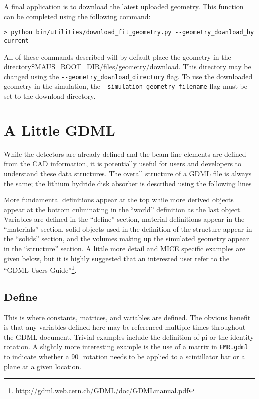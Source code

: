 A final application is to download the latest uploaded geometry. This
function can be completed using the following command:
\begin{verbatim}
> python bin/utilities/download_fit_geometry.py --geometry_download_by current
\end{verbatim}
All of these commands described will by default place the geometry in
the directory\linebreak\${MAUS\_ROOT\_DIR}/files/geometry/download. This
directory may be changed using the\linebreak
\verb+--geometry_download_directory+ flag. To use the downloaded
geometry in the simulation, the\linebreak\verb+--simulation_geometry_filename+
flag must be set to the download directory. 


\section{A Little GDML}
While the detectors are already defined and the beam line elements are
defined from the CAD information, it is potentially useful for users
and developers to understand these data structures. The overall
structure of a GDML file is always the same; the lithium hydride disk
absorber is described using the following lines


More fundamental definitions appear at the top while more derived
objects appear at the bottom culminating in the ``world'' definition
as the last object. Variables are defined in the ``define'' section,
material definitions appear in the ``materials'' section, solid
objects used in the definition of the structure appear in the
``solids'' section, and the volumes making up the simulated geometry
appear in the ``structure'' section.  A little more detail and MICE
specific examples are given below, but it is highly suggested that an
interested user refer to the ``GDML Users
Guide''\footnote{\url{http://gdml.web.cern.ch/GDML/doc/GDMLmanual.pdf}}.

\subsection{Define}
This is where constants, matrices, and variables are defined. The
obvious benefit is that any variables defined here may be referenced
multiple times throughout the GDML document. Trivial examples include
the definition of pi or the identity rotation. A slightly more
interesting example is the use of a matrix in \verb+EMR.gdml+ to
indicate whether a 90$^{\circ}$ rotation needs to be applied to a
scintillator bar or a plane at a given location.

